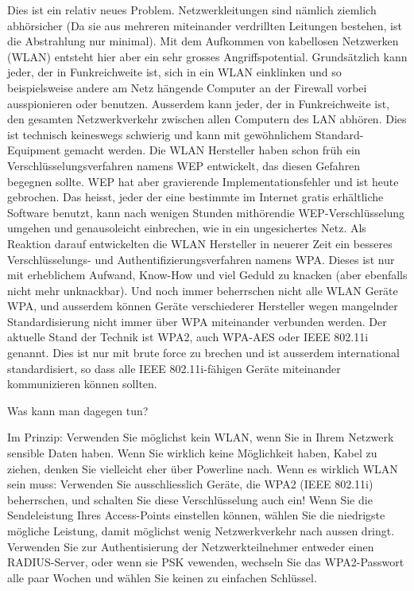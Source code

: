 Dies ist ein relativ neues Problem. Netzwerkleitungen sind nämlich ziemlich abhörsicher (Da sie aus mehreren miteinander verdrillten
Leitungen bestehen, ist die Abstrahlung nur minimal). Mit dem Aufkommen von kabellosen Netzwerken (WLAN) entsteht hier aber ein sehr
grosses Angriffspotential. Grundsätzlich kann jeder, der in Funkreichweite ist, sich in ein WLAN einklinken und so beispielsweise andere
am Netz hängende Computer an der Firewall vorbei ausspionieren oder benutzen. Ausserdem kann jeder, der in Funkreichweite ist, den gesamten
Netzwerkverkehr zwischen allen Computern des LAN abhören. Dies ist technisch keineswegs schwierig und kann mit gewöhnlichem Standard-Equipment
gemacht werden. Die WLAN Hersteller haben schon früh ein Verschlüsselungsverfahren namens WEP entwickelt, das diesen Gefahren begegnen sollte.
WEP hat aber gravierende Implementationsfehler und ist heute gebrochen. Das heisst, jeder der eine bestimmte im Internet gratis erhältliche
Software benutzt, kann nach wenigen Stunden \glqq mithören\grqq die
WEP-Verschlüsselung umgehen und genausoleicht einbrechen, wie in ein ungesichertes Netz. Als Reaktion darauf entwickelten die
WLAN Hersteller in neuerer Zeit ein besseres Verschlüsselungs- und Authentifizierungsverfahren namens WPA. Dieses ist nur mit erheblichem
Aufwand, Know-How und viel Geduld zu knacken (aber ebenfalls nicht mehr unknackbar).
Und noch immer beherrschen nicht alle WLAN Geräte WPA, und ausserdem können Geräte verschiederer Hersteller wegen mangelnder
Standardisierung nicht immer über WPA miteinander verbunden werden. Der aktuelle Stand der Technik ist WPA2, auch WPA-AES oder
IEEE 802.11i genannt. Dies ist nur mit brute force zu brechen und ist ausserdem international standardisiert, so dass alle IEEE
802.11i-fähigen Geräte miteinander kommunizieren können sollten.

\medskip
Was kann man dagegen tun?

Im Prinzip: Verwenden Sie möglichst kein WLAN, wenn Sie in Ihrem Netzwerk sensible Daten haben. Wenn Sie wirklich keine Möglichkeit haben,
Kabel zu ziehen, denken Sie vielleicht eher über Powerline nach. Wenn es wirklich WLAN sein muss: Verwenden Sie ausschliesslich Geräte, die
WPA2 (IEEE 802.11i) beherrschen, und schalten Sie diese Verschlüsselung auch ein! Wenn Sie die Sendeleistung Ihres Access-Points einstellen
können, wählen Sie die niedrigste mögliche Leistung, damit möglichst wenig Netzwerkverkehr nach aussen dringt. Verwenden Sie zur Authentisierung
der Netzwerkteilnehmer entweder einen RADIUS-Server, oder wenn sie PSK vewenden, wechseln Sie das WPA2-Passwort alle paar Wochen und
wählen Sie keinen zu einfachen Schlüssel.

